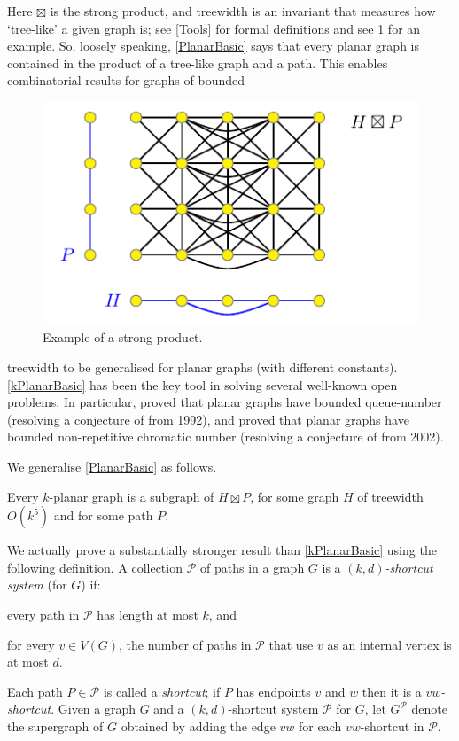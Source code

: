 \documentclass{patmorin}
\begin{document}
Here $\boxtimes$ is the strong product, and treewidth is an invariant that measures how `tree-like' a given graph is; see \cref{Tools} for formal definitions and see \cref{ProductExample} for an example.  
So, loosely speaking, \cref{PlanarBasic} says that every planar graph is contained in the product of a tree-like graph and a path. This enables combinatorial results for graphs of bounded 
\begin{figure} 
\centering
\includegraphics{ProductExample}
\caption{Example of a strong product.}
\label{ProductExample}
\end{figure}
treewidth to be generalised for planar graphs (with different constants). \cref{kPlanarBasic} has been the key tool in solving several well-known open problems. In particular, \citet{dujmovic.joret.ea:planar} proved that planar graphs have bounded queue-number (resolving a conjecture of \citet{HLR92} from 1992), and \citet{dujmovic.esperet.ea:planar}  proved that planar graphs have bounded non-repetitive chromatic number (resolving a conjecture of \citet{AGHR-RSA02} from 2002). 

We generalise \cref{PlanarBasic} as follows. 

\begin{thm}
\label{kPlanarBasic}
Every $k$-planar graph is a subgraph of $H\boxtimes P$, for some graph $H$ of treewidth $O(k^5)$ and for some path $P$. 
\end{thm}

We actually prove a substantially stronger result than \cref{kPlanarBasic} using the following definition. A collection $\mathcal{P}$ of paths in a graph $G$ is a \emph{$(k,d)$-shortcut system} (for $G$) if:
\begin{compactitem}
\item every path in $\mathcal{P}$ has length at most $k$, and
\item for every $v\in V(G)$, the number of paths in $\mathcal{P}$ that use $v$ as an internal vertex is at most $d$.
\end{compactitem} 
Each path $P\in\mathcal{P}$ is called a \emph{shortcut}; if $P$ has endpoints $v$ and $w$ then it is a \emph{$vw$-shortcut}. Given a graph $G$ and a $(k,d)$-shortcut system $\mathcal{P}$ for $G$, let $G^{\mathcal{P}}$ denote the supergraph of $G$ obtained by adding the edge $vw$ for each $vw$-shortcut in $\mathcal{P}$. 
\end{document}
